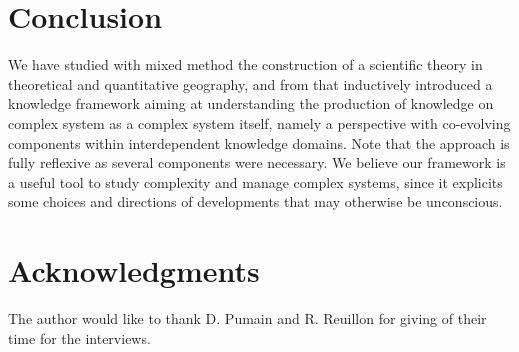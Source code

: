 \documentclass[runningheads,a4paper]{llncs2e/llncs}
\begin{document}
\section{Conclusion}

\vspace{-0.3cm}

We have studied with mixed method the construction of a scientific theory in theoretical and quantitative geography, and from that inductively introduced a knowledge framework aiming at understanding the production of knowledge on complex system as a complex system itself, namely a perspective with co-evolving components within interdependent knowledge domains. Note that the approach is fully reflexive as several components were necessary. We believe our framework is a useful tool to study complexity and manage complex systems, since it explicits some choices and directions of developments that may otherwise be unconscious.

\vspace{-0.3cm}

\section*{Acknowledgments}

The author would like to thank D. Pumain and R. Reuillon for giving of their time for the interviews.

\vspace{-0.3cm}





\end{document}
